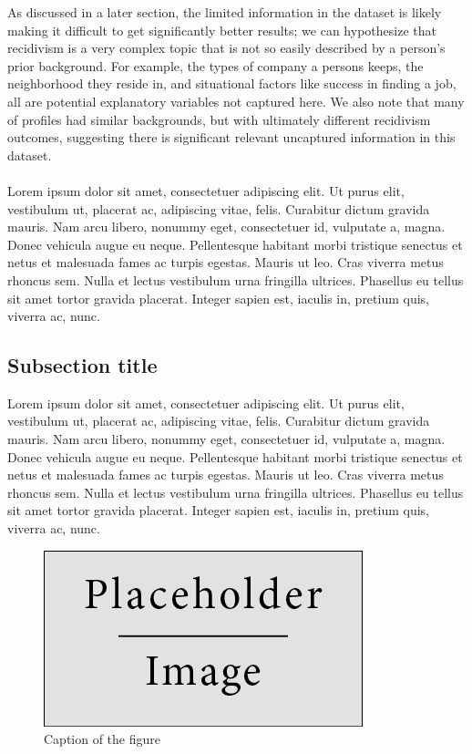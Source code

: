 \documentclass[a4paper]{article}
\theoremstyle{plain}
\begin{document}
As discussed in a later section, the limited information in the dataset is likely making it difficult to get significantly better results; we can hypothesize that recidivism is a very complex topic that is not so easily described by a person's prior background. For example, the types of company a persons keeps, the neighborhood they reside in, and situational factors like success in finding a job, all are potential explanatory variables not captured here.\cite{tillyer2011social} We also note that many of profiles had similar backgrounds, but with ultimately different recidivism outcomes, suggesting there is significant relevant uncaptured information in this dataset.

\paragraph{}
Lorem ipsum dolor sit amet, consectetuer adipiscing elit. Ut purus elit, vestibulum ut, placerat ac, adipiscing vitae, felis. Curabitur dictum gravida mauris. Nam arcu libero, nonummy eget, consectetuer id, vulputate a, magna. Donec vehicula augue eu neque. Pellentesque habitant morbi tristique senectus et netus et malesuada fames ac turpis egestas. Mauris ut leo. Cras viverra metus rhoncus sem. Nulla et lectus vestibulum urna fringilla ultrices. Phasellus eu tellus sit amet tortor gravida placerat. Integer sapien est, iaculis in, pretium quis, viverra ac, nunc.

\subsection{Subsection title}

Lorem ipsum dolor sit amet, consectetuer adipiscing elit. Ut purus elit, vestibulum ut, placerat ac, adipiscing vitae, felis. Curabitur dictum gravida mauris. Nam arcu libero, nonummy eget, consectetuer id, vulputate a, magna. Donec vehicula augue eu neque. Pellentesque habitant morbi tristique senectus et netus et malesuada fames ac turpis egestas. Mauris ut leo. Cras viverra metus rhoncus sem. Nulla et lectus vestibulum urna fringilla ultrices. Phasellus eu tellus sit amet tortor gravida placerat. Integer sapien est, iaculis in, pretium quis, viverra ac, nunc.

\begin{figure}[H]
\centering
\includegraphics[scale=0.6]{test_image.jpg}
\caption{Caption of the figure}
\end{figure}
\end{document}
